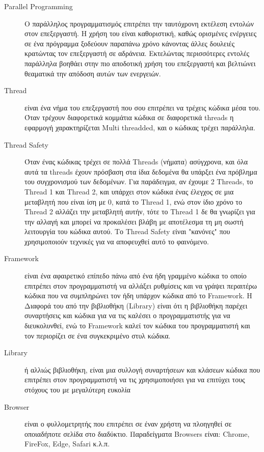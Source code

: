 \begin{Definitions}

\begin{description}
    \item [Parallel Programming] Ο παράλληλος προγραμματισμός επιτρέπει την ταυτόχρονη εκτέλεση εντολών στον επεξεργαστή. Η χρήση του είναι καθοριστική, καθώς ορισμένες ενέργειες σε ένα πρόγραμμα ξοδεύουν παραπάνω χρόνο κάνοντας άλλες δουλειές κρατώντας τον επεξεργαστή σε αδράνεια. Εκτελώντας περισσότερες εντολές παράλληλα βοηθάει στην πιο αποδοτική χρήση του επεξεργαστή και βελτιώνει θεαματικά την απόδοση αυτών των ενεργειών. 
    \item [Thread] είναι ένα νήμα του επεξεργαστή που σου επιτρέπει να τρέχεις κώδικα μέσα του. Όταν τρέχουν διαφορετικά κομμάτια κώδικα σε διαφορετικά threads η εφαρμογή χαρακτηρίζεται Multi threadded, και ο κώδικας τρέχει παράλληλα.
    \item [Thread Safety] Όταν ένας κώδικας τρέχει σε πολλά Threads (νήματα) ασύγχρονα, και όλα αυτά τα threads έχουν πρόσβαση στα ίδια δεδομένα θα υπάρξει ένα πρόβλημα του συγχρονισμού των δεδομένων. Για παράδειγμα, αν έχουμε 2 Threads, το Thread 1 και Thread 2, και υπάρχει στον κώδικα ένας έλεγχος σε μια μεταβλητή που είναι ίση με 0, κατά το Thread 1, ενώ στον ίδιο χρόνο το Thread 2 αλλάζει την μεταβλητή αυτήν, τότε το Thread 1 δε θα γνωρίζει για την αλλαγή και μπορεί να προκαλέσει βλάβη με αποτέλεσμα τη μη σωστή λειτουργία του κώδικα αυτού. Το Thread Safety είναι "κανόνες" που χρησιμοποιούν τεχνικές για να αποφευχθεί αυτό το φαινόμενο.
    \item [Framework] είναι ένα αφαιρετικό επίπεδο πάνω από ένα ήδη γραμμένο κώδικα το οποίο επιτρέπει στον προγραμματιστή να αλλάξει ρυθμίσεις και να γράψει περαιτέρω κώδικα που να συμπληρώνει τον ήδη υπάρχον κώδικα από το Framework. Η Διαφορά του από την βιβλιοθήκη (Library) είναι ότι η βιβλιοθήκη παρέχει συναρτήσεις και κώδικα για να τις καλέσει ο προγραμματιστής για να διευκολυνθεί, ενώ το Framework καλεί τον κώδικα του προγραμματιστή και τον περιορίζει σε ένα συγκεκριμένο στυλ κώδικα.
    \item [Library] ή αλλιώς βιβλιοθήκη, είναι μια συλλογή συναρτήσεων και κλάσεων κώδικα που επιτρέπει στον προγραμματιστή να τις χρησιμοποιήσει για να επιτύχει τους στόχους του με μεγαλύτερη ευκολία
    \item [Browser] είναι ο φυλλομετρητής που επιτρέπει σε έναν χρήστη να πλοηγηθεί σε οποιαδήποτε σελίδα στο διαδύκτιο. Παραδείγματα Browsers είναι: Chrome, FireFox, Edge, Safari κ.λ.π.

\end{description}
\end{Definitions}
